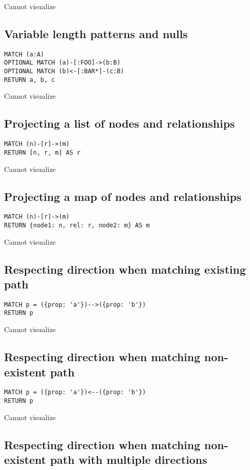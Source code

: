 Cannot visualize
\subsection{Variable length patterns and nulls}

\begin{lstlisting}
MATCH (a:A)
OPTIONAL MATCH (a)-[:FOO]->(b:B)
OPTIONAL MATCH (b)<-[:BAR*]-(c:B)
RETURN a, b, c
\end{lstlisting}

Cannot visualize
\subsection{Projecting a list of nodes and relationships}

\begin{lstlisting}
MATCH (n)-[r]->(m)
RETURN [n, r, m] AS r
\end{lstlisting}

Cannot visualize
\subsection{Projecting a map of nodes and relationships}

\begin{lstlisting}
MATCH (n)-[r]->(m)
RETURN {node1: n, rel: r, node2: m} AS m
\end{lstlisting}

Cannot visualize
\subsection{Respecting direction when matching existing path}

\begin{lstlisting}
MATCH p = ({prop: 'a'})-->({prop: 'b'})
RETURN p
\end{lstlisting}

Cannot visualize
\subsection{Respecting direction when matching non-existent path}

\begin{lstlisting}
MATCH p = ({prop: 'a'})<--({prop: 'b'})
RETURN p
\end{lstlisting}

Cannot visualize
\subsection{Respecting direction when matching non-existent path with multiple directions}


